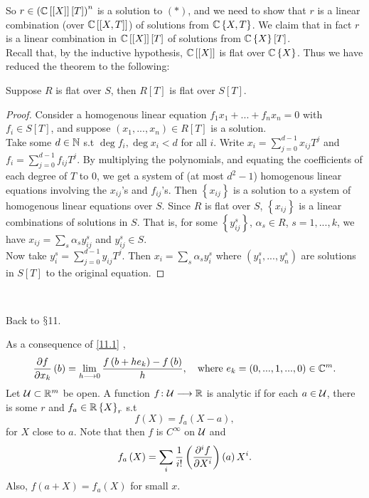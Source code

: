 So $r\in\left(\mathbb{C}\left[\left[X\right]\right]\left[T\right]\right)^{n}$
is a solution to $\left(\ast\right)$, and we need to show that $r$
is a linear combination (over $\mathbb{C}\left[\left[X,T\right]\right]$)
of solutions from $\mathbb{C}\left\{ X,T\right\} $. We claim that in fact
$r$ is a linear combination in $\mathbb{C}\left[\left[X\right]\right]\left[T\right]$
of solutions from $\mathbb{C}\left\{ X\right\} \left[T\right]$. \\
Recall that, by the inductive hypothesis, $\mathbb{C}\left[\left[X\right]\right]$
is flat over $\mathbb{C}\left\{ X\right\} $. Thus we have reduced the theorem
to the following:
\begin{prop*}
Suppose $R$ is flat over $S$, then $R\left[T\right]$ is flat over
$S\left[T\right]$.\end{prop*}
\begin{proof}
Consider a homogenous linear equation $f_{1}x_{1}+...+f_{n}x_{n}=0$
with $f_{i}\in S\left[T\right]$, and suppose $\left(x_{1},...,x_{n}\right)\in R\left[T\right]$
is a solution. \\
Take some $d\in\mathbb{N}$ s.t $\deg f_{i},\deg x_{i}<d$ for all $i$. Write
$x_{i}=\sum_{j=0}^{d-1}x_{ij}T^{j}$ and $f_{i}=\sum_{j=0}^{d-1}f_{ij}T^{j}$.
By multiplying the polynomials, and equating the coefficients of each
degree of $T$ to $0$, we get a system of (at most $d^{2}-1$) homogenous
linear equations involving the $x_{ij}$'s and $f_{ij}$'s. Then $\left\{ x_{ij}\right\} $
is a solution to a system of homogenous linear equations over $S$.
Since $R$ is flat over $S$, $\left\{ x_{ij}\right\} $ is a linear
combinations of solutions in $S$. That is, for some $\left\{ y_{ij}^{s}\right\} $,
$\alpha_{s}\in R$, $s=1,...,k$, we have $x_{ij}=\sum_{s}\alpha_{s}y_{ij}^{s}$
and $y_{ij}^{s}\in S$.\\
Now take $y_{i}^{s}=\sum_{j=0}^{d-1}y_{ij}T^{j}$. Then $x_{i}=\sum_{s}\alpha_{s}y_{i}^{s}$
where $\left(y_{1}^{s},...,y_{n}^{s}\right)$ are solutions in $S\left[T\right]$
to the original equation.
\end{proof}
~

Back to $\mathsection$11.

As a consequence of \ref{11.1} , 
\[
\frac{\partial f}{\partial x_{k}}\left(b\right)=\lim_{h\longrightarrow0}\frac{f\left(b+he_{k}\right)-f\left(b\right)}{h},\quad\textrm{where }e_{k}=\left(0,...,1,...,0\right)\in\mathbb{C}^{m}.
\]
Let $\mathcal{U}\subset\mathbb{R}^{m}$ be open. A function $f\colon\mathcal{U}\longrightarrow\mathbb{R}$ is analytic
if for each $a\in\mathcal{U}$, there is some $r$ and $f_{a}\in\mathbb{R}\left\{ X\right\} _{r}$
s.t 
\[
f\left(X\right)=f_{a}\left(X-a\right),
\]
for $X$ close to $a$. Note that then $f$ is $C^{\infty}$ on $\mathcal{U}$
and 
\[
f_{a}\left(X\right)=\sum_{i}\frac{1}{i!}\left(\frac{\partial^{i}f}{\partial X^{i}}\right)\left(a\right)X^{i}.
\]
Also, $f\left(a+X\right)=f_{a}\left(X\right)$ for small $x$.

